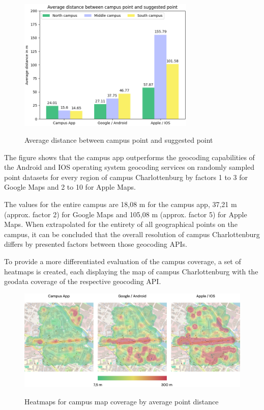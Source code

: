 \begin{figure}[H]
	\centering
	\includegraphics[width=0.75\textwidth]{images/average_campus_point_distance.png}\\
	\caption{Average distance between campus point and suggested point}
\end{figure}

The figure shows that the campus app outperforms the geocoding capabilities of the Android and IOS operating system geocoding services on randomly sampled point datasets for every region of campus Charlottenburg by factors 1 to 3 for Google Maps and 2 to 10 for Apple Maps.

The values for the entire campus are 18,08 m for the campus app, 37,21 m (approx. factor 2) for Google Maps and 105,08 m (approx. factor 5) for Apple Maps. When extrapolated for the entirety of all geographical points on the campus, it can be concluded that the overall resolution of campus Charlottenburg differs by presented factors between those geocoding APIs.

\newpage

To provide a more differentiated evaluation of the campus coverage, a set of heatmaps is created, each displaying the map of campus Charlottenburg with the geodata coverage of the respective geocoding API.

\begin{figure}[H]
	\centering
	\includegraphics[width=1.0\textwidth]{images/heatmaps.png}\\
	\caption{Heatmaps for campus map coverage by average point distance}
\end{figure}

